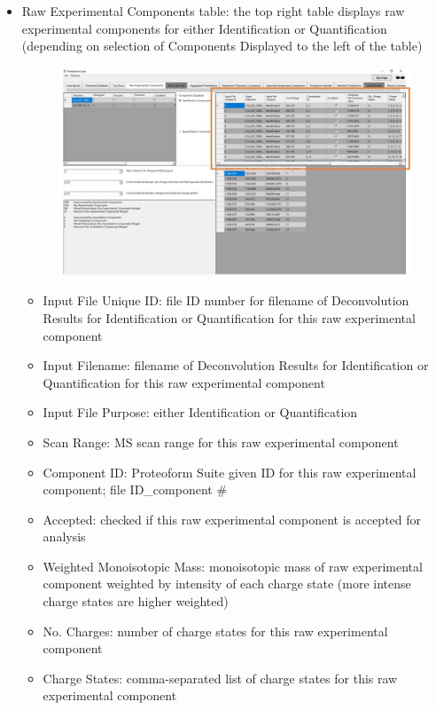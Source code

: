 \begin{itemize}
\begin{figure}[h]
\end{figure}
\pagebreak
	\item Raw Experimental Components table: the top right table displays raw experimental components for either Identification or Quantification (depending on selection of Components Displayed to the left of the table)
		\begin{figure}[h]
\centering
\includegraphics[scale=0.5]{figures/rawcomponents3.jpg}
\end{figure}
	\begin{itemize}
		\item Input File Unique ID: file ID number for filename of Deconvolution Results for Identification or Quantification for this raw experimental component
		\item Input Filename: filename of Deconvolution Results for Identification or Quantification for this raw experimental component
		\item Input File Purpose: either Identification or Quantification
		\item Scan Range: MS scan range for this raw experimental component
		\item Component ID: Proteoform Suite given ID for this raw experimental component; file ID\_component \#
		\item Accepted: checked if this raw experimental component is accepted for analysis
		\item Weighted Monoisotopic Mass: monoisotopic mass of raw experimental component weighted by intensity of each charge state (more intense charge states are higher weighted)
		\item No. Charges: number of charge states for this raw experimental component
		\item Charge States: comma-separated list of charge states for this raw experimental component

\end{itemize}
\end{itemize}
